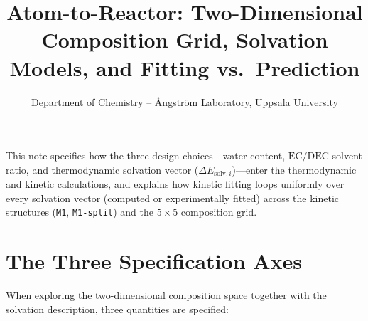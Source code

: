 \documentclass[11pt,a4paper]{article}
\title{\textbf{Atom-to-Reactor: Two-Dimensional Composition Grid, Solvation Models, and Fitting vs.\ Prediction}}
\author{Department of Chemistry -- \AA ngstr\"om Laboratory, Uppsala University}
\date{}
\begin{document}
\sloppy
\maketitle

This note specifies how the three design choices---water content, $\text{EC}/\text{DEC}$ solvent ratio, and thermodynamic solvation vector ($\Delta E_{\text{solv}, i}$)---enter the thermodynamic and kinetic calculations, and explains how kinetic fitting loops uniformly over every solvation vector (computed or experimentally fitted) across the kinetic structures (\texttt{M1}, \texttt{M1-split}) and the $5 \times 5$ composition grid.

\section{The Three Specification Axes}

When exploring the two-dimensional composition space together with the solvation description, three quantities are specified:
\end{document}
